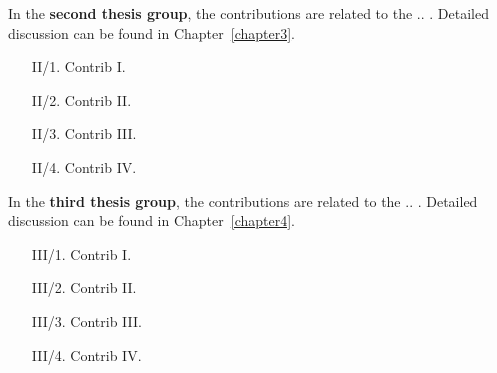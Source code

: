 \vspace{1cm}

\noindent
In the \textbf{second thesis group}, the contributions are related to the .. . Detailed discussion can be found in Chapter~\ref{chapter3}.

\begin{enumerate}[wide = 0pt, widest = {II/5.}, leftmargin =*]
	\item[II/1.] Contrib I.
	
	\item[II/2.] Contrib II.
	
	\item[II/3.] Contrib III.
	
	\item[II/4.] Contrib IV.
\end{enumerate}

\vfill
\pagebreak

\noindent
In the \textbf{third thesis group}, the contributions are related to the .. . Detailed discussion can be found in Chapter~\ref{chapter4}.

\begin{enumerate}[wide = 0pt, widest = {III/5.}, leftmargin =*]
	\item[III/1.] Contrib I.
	
	\item[III/2.] Contrib II.
	
	\item[III/3.] Contrib III.
	
	\item[III/4.] Contrib IV.
\end{enumerate}
